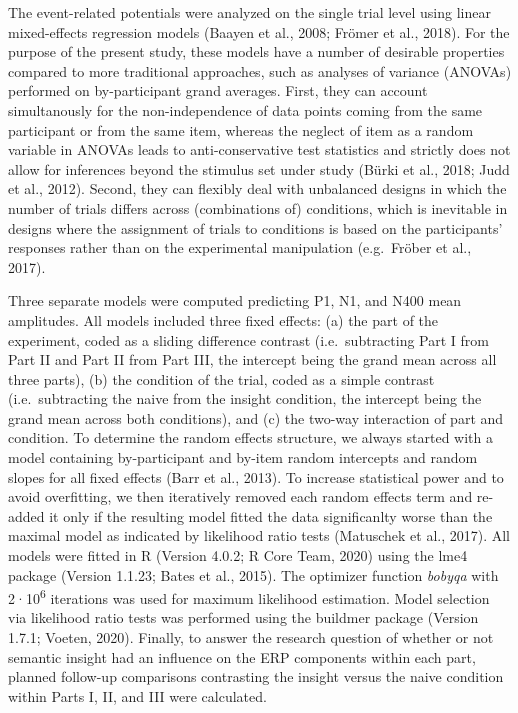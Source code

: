 \documentclass[
  english,
  man,11pt,floatsintext]{apa7}
\begin{document}
The event-related potentials were analyzed on the single trial level using linear mixed-effects regression models (Baayen et al., 2008; Frömer et al., 2018). For the purpose of the present study, these models have a number of desirable properties compared to more traditional approaches, such as analyses of variance (ANOVAs) performed on by-participant grand averages. First, they can account simultanously for the non-independence of data points coming from the same participant or from the same item, whereas the neglect of item as a random variable in ANOVAs leads to anti-conservative test statistics and strictly does not allow for inferences beyond the stimulus set under study (Bürki et al., 2018; Judd et al., 2012). Second, they can flexibly deal with unbalanced designs in which the number of trials differs across (combinations of) conditions, which is inevitable in designs where the assignment of trials to conditions is based on the participants' responses rather than on the experimental manipulation (e.g.~Fröber et al., 2017).

Three separate models were computed predicting P1, N1, and N400 mean amplitudes. All models included three fixed effects: (a) the part of the experiment, coded as a sliding difference contrast (i.e.~subtracting Part I from Part II and Part II from Part III, the intercept being the grand mean across all three parts), (b) the condition of the trial, coded as a simple contrast (i.e.~subtracting the naive from the insight condition, the intercept being the grand mean across both conditions), and (c) the two-way interaction of part and condition. To determine the random effects structure, we always started with a model containing by-participant and by-item random intercepts and random slopes for all fixed effects (Barr et al., 2013). To increase statistical power and to avoid overfitting, we then iteratively removed each random effects term and re-added it only if the resulting model fitted the data significanlty worse than the maximal model as indicated by likelihood ratio tests (Matuschek et al., 2017). All models were fitted in R (Version 4.0.2; R Core Team, 2020) using the lme4 package (Version 1.1.23; Bates et al., 2015). The optimizer function \emph{bobyqa} with 2·10\textsuperscript{6} iterations was used for maximum likelihood estimation. Model selection via likelihood ratio tests was performed using the buildmer package (Version 1.7.1; Voeten, 2020). Finally, to answer the research question of whether or not semantic insight had an influence on the ERP components within each part, planned follow-up comparisons contrasting the insight versus the naive condition within Parts I, II, and III were calculated.
\end{document}
